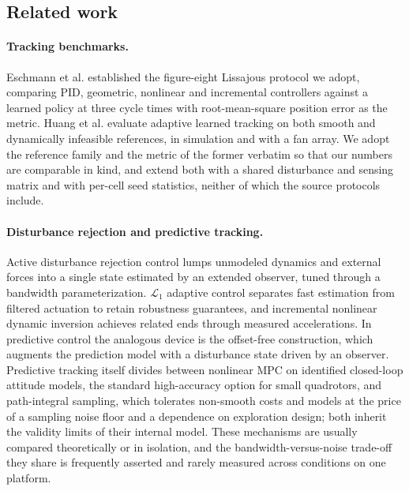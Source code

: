 \subsection{Related work}

\paragraph{Tracking benchmarks.}
Eschmann et al.\cite{eschmann2024learning} established the figure-eight Lissajous
protocol we adopt, comparing PID, geometric, nonlinear and incremental controllers
against a learned policy at three cycle times with root-mean-square position error as
the metric. Huang et al.\cite{huang2023datt} evaluate adaptive learned tracking on both
smooth and dynamically infeasible references, in simulation and with a fan array. We
adopt the reference family and the metric of the former verbatim so that our numbers are
comparable in kind, and extend both with a shared disturbance and sensing matrix and
with per-cell seed statistics, neither of which the source protocols include.

\paragraph{Disturbance rejection and predictive tracking.}
Active disturbance rejection control\cite{han2009adrc} lumps unmodeled dynamics and
external forces into a single state estimated by an extended observer, tuned through a
bandwidth parameterization\cite{gao2003scaling}. $\mathcal{L}_1$ adaptive
control\cite{hovakimyan2010l1} separates fast estimation from filtered actuation to
retain robustness guarantees, and incremental nonlinear dynamic
inversion\cite{smeur2016indi} achieves related ends through measured accelerations. In
predictive control the analogous device is the offset-free
construction\cite{maeder2009offsetfree}, which augments the prediction model with a
disturbance state driven by an observer. Predictive tracking itself divides between
nonlinear MPC on identified closed-loop attitude models, the standard high-accuracy
option for small quadrotors, and path-integral sampling\cite{williams2018mppi}, which
tolerates non-smooth costs and models at the price of a sampling noise floor and a
dependence on exploration design; both inherit the validity limits of their internal
model. These mechanisms are usually compared theoretically or in isolation, and the
bandwidth-versus-noise trade-off they share is frequently asserted and rarely measured
across conditions on one platform.

